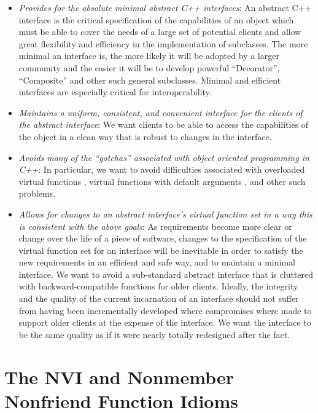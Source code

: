 \documentclass[pdf,ps2pdf,11pt]{SANDreport}
\begin{document}
\begin{itemize}

{}\item\textit{Provides for the absolute minimal abstract C++ interfaces}: An
abstract C++ interface is the critical specification of the capabilities of an
object which must be able to cover the needs of a large set of potential
clients and allow great flexibility and efficiency in the implementation of
subclasses.  The more minimal an interface is, the more likely it will be
adopted by a larger community and the easier it will be to develop powerful
``Decorator'', ``Composite'' and other such general subclasses.  Minimal and
efficient interfaces are especially critical for interoperability.

{}\item\textit{Maintains a uniform, consistent, and convenient interface for
the clients of the abstract interface}: We want clients to be able to access
the capabilities of the object in a clean way that is robust to changes in the
interface.

{}\item\textit{Avoids many of the ``gotchas'' associated with object oriented
programming in C++}: In particular, we want to avoid difficulties associated
with overloaded virtual functions {}\cite[Item 73]{C++Gotchas03}, virtual
functions with default arguments {}\cite[Item 37]{EffectiveC++3rd}, and other
such problems.

{}\item\textit{Allows for changes to an abstract interface's virtual function
set in a way this is consistent with the above goals}: As requirements become
more clear or change over the life of a piece of software, changes to the
specification of the virtual function set for an interface will be inevitable
in order to satisfy the new requirements in an efficient and safe way, and to
maintain a minimal interface.  We want to avoid a sub-standard abstract
interface that is cluttered with backward-compatible functions for older
clients.  Ideally, the integrity and the quality of the current incarnation of
an interface should not suffer from having been incrementally developed where
compromises where made to support older clients at the expense of the
interface.  We want the interface to be the same quality as if it were nearly
totally redesigned after the fact.

\end{itemize}

%
\section{The NVI and Nonmember Nonfriend Function Idioms}
%
\end{document}
